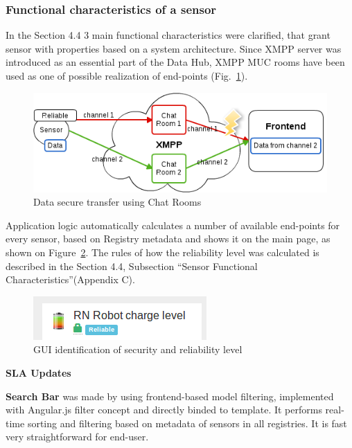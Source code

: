 \subsubsection{Functional characteristics of a sensor}
In the Section 4.4 3 main functional characteristics were clarified, that grant sensor with properties based on a system architecture.
Since XMPP server was introduced as an essential part of the Data Hub, XMPP MUC rooms have been used as one of possible realization of end-points (Fig.~\ref{img:reliability}). 
\begin{figure}[!ht]
\centering
\includegraphics[scale=0.6]{images/security.png}   
\caption[Security]{Data secure transfer using Chat Rooms} 
\label{img:reliability}                        
\end{figure}
Application logic automatically calculates a number of available end-points for every sensor, based on Registry metadata and shows it on the main page, as shown on Figure~\ref{img:icons}. The rules of how the reliability level was calculated is described in the Section 4.4, Subsection ``Sensor Functional Characteristics''(Appendix C).
\newline
\begin{figure}[!ht]
\centering
\includegraphics[scale=1.0]{Screenshots/Icons.png}   
\caption[GUI identification of security and reliability level]{GUI identification of security and reliability level}
\label{img:icons}    
\end{figure}

\textbf{SLA Updates}

\textbf{Search Bar} was made by using frontend-based model filtering, implemented with Angular.js filter concept and directly binded to template. It performs real-time sorting and filtering based on metadata of sensors in all registries. It is fast very straightforward for end-user. 

